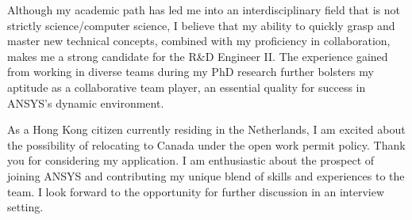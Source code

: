 \documentclass[11pt, a4paper]{awesome-cv}
\begin{document}
\begin{cvletter}
Although my academic path has led me into an interdisciplinary field that is not strictly science/computer science, I believe that my ability to quickly grasp and master new technical concepts, combined with my proficiency in collaboration, makes me a strong candidate for the R\&D Engineer II. The experience gained from working in diverse teams during my PhD research further bolsters my aptitude as a collaborative team player, an essential quality for success in ANSYS's dynamic environment.

As a Hong Kong citizen currently residing in the Netherlands, I am excited about the possibility of relocating to Canada under the open work permit policy. Thank you for considering my application. I am enthusiastic about the prospect of joining ANSYS and contributing my unique blend of skills and experiences to the team. I look forward to the opportunity for further discussion in an interview setting.


\end{cvletter}


\makeletterclosing
\end{document}
